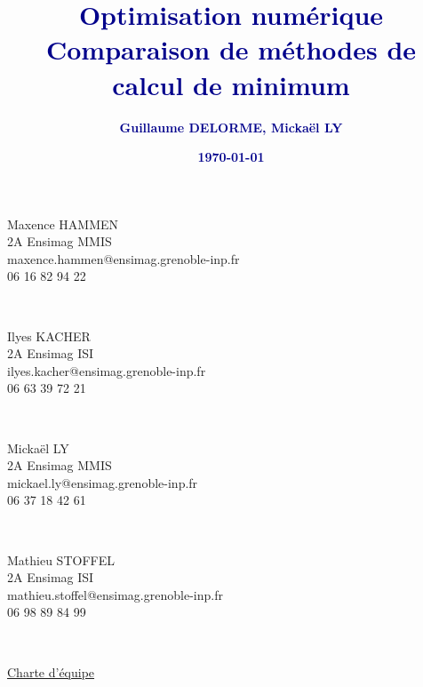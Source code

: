 \documentclass[a4paper,11pt]{article}
\title{\huge \textbf{{\textcolor{darkblue}{Optimisation numérique\\ \LARGE Comparaison de méthodes de calcul de minimum}}}}
\author{\large \textbf{{\textcolor{darkblue}{Guillaume DELORME, Mickaël LY}}}}
\date{\Large \textbf{\textcolor{darkblue}{\today}}}
\begin{document}
	\begin{spacing}{1.3}%
		\thispagestyle{fancy}

		\begin{minipage}{0.33\linewidth}
			\centering
			\Large Maxence HAMMEN \\
			\normalsize 2A Ensimag MMIS \\
			\small maxence.hammen@ensimag.grenoble-inp.fr\\
			\small 06 16 82 94 22
		\end{minipage}
		\begin{minipage}{0.33\linewidth}
                  ~~~
		\end{minipage}
		\begin{minipage}{0.33\linewidth}
			\centering
			\Large Ilyes KACHER \\
			\normalsize 2A Ensimag ISI \\
			\small ilyes.kacher@ensimag.grenoble-inp.fr\\
			\small 06 63 39 72 21
		\end{minipage}\\[0.5cm]

		
		\begin{minipage}{0.33\linewidth}
			\centering
			\Large Mickaël LY\\
			\normalsize 2A Ensimag MMIS\\
			\small mickael.ly@ensimag.grenoble-inp.fr\\
			\small 06 37 18 42 61
		\end{minipage}
                \begin{minipage}{0.33\linewidth}
                  ~~~
		\end{minipage}
		\begin{minipage}{0.33\linewidth}
			\centering
			\Large Mathieu STOFFEL \\
			\normalsize 2A Ensimag ISI \\
			\small mathieu.stoffel@ensimag.grenoble-inp.fr\\
			\small 06 98 89 84 99
		\end{minipage}\\

		\begin{center}
			
			\Huge \underline{Charte d'équipe}
			
		\end{center} ~~\\


\end{spacing}
\end{document}
